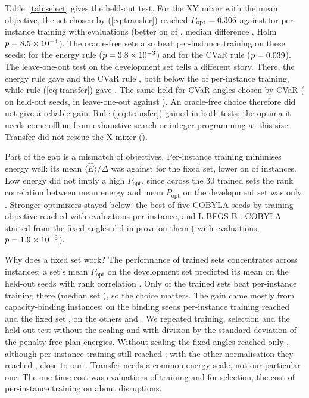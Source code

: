 \documentclass[conference]{IEEEtran}
\begin{document}
Table~\ref{tab:select} gives the held-out test. For the XY mixer with the mean objective, the set chosen by (\ref{eq:transfer}) reached $P_{\mathrm{opt}}=0.306$ against \SelTrained{} for per-instance training with \HoCumFour{} evaluations (better on \SelPoptWins{} of \HoN, median difference \SelPoptMed, Holm $p=8.5\times10^{-4}$). The oracle-free sets also beat per-instance training on these seeds: \SelEn{} for the energy rule ($p=3.8\times10^{-3}$) and \SelCv{} for the CVaR rule ($p=0.039$). The leave-one-out test on the development set tells a different story. There, the energy rule gave \SelEnLoo{} and the CVaR rule \SelCvLoo, both below the \SelDevTrained{} of per-instance training, while rule (\ref{eq:transfer}) gave \SelPoptLoo. The same held for CVaR angles chosen by CVaR (\SelCvarCv{} on held-out seeds, \SelCvarCvLoo{} in leave-one-out against \SelCvarDevTrained). An oracle-free choice therefore did not give a reliable gain. Rule (\ref{eq:transfer}) gained in both tests; the optima it needs come offline from exhaustive search or integer programming at this size. Transfer did not rescue the X mixer (\SelXPopt).

Part of the gap is a mismatch of objectives. Per-instance training minimises energy well: its mean $\langle\hat E\rangle/\Delta$ was \EnTrained{} against \EnFixed{} for the fixed set, lower on \EnLower{} of \HoN{} instances. Low energy did not imply a high $P_{\mathrm{opt}}$, since across the 30 trained sets the rank correlation between mean energy and mean $P_{\mathrm{opt}}$ on the development set was only \RhoEnPopt. Stronger optimizers stayed below: the best of five COBYLA seeds by training objective reached \SelBestFive{} with \SelBestFiveEv{} evaluations per instance, and L-BFGS-B \SelLbfgs. COBYLA started from the fixed angles did improve on them (\StrWarm{} with \StrWarmEv{} evaluations, $p=1.9\times10^{-3}$).

Why does a fixed set work? The performance of trained sets concentrates across instances: a set's mean $P_{\mathrm{opt}}$ on the development set predicted its mean on the held-out seeds with rank correlation \RhoDevHeld. Only \CandBeat{} of the \CandN{} trained sets beat per-instance training there (median set \CandMedian), so the choice matters. The gain came mostly from capacity-binding instances: on the \HoNBind{} binding seeds per-instance training reached \HoBindTrained{} and the fixed set \HoBindFixed, on the others \HoNonBindTrained{} and \HoNonBindFixed. We repeated training, selection and the held-out test without the scaling and with division by the standard deviation of the penalty-free plan energies. Without scaling the fixed angles reached only \NormNoneFixed, although per-instance training still reached \NormNoneDevTrained; with the other normalisation they reached \NormStdFixed, close to our \NormDepFixed. Transfer needs a common energy scale, not our particular one. The one-time cost was \OffTrain{} evaluations of training and \OffCross{} for selection, the cost of per-instance training on about \OffBreakEven{} disruptions.
\end{document}
